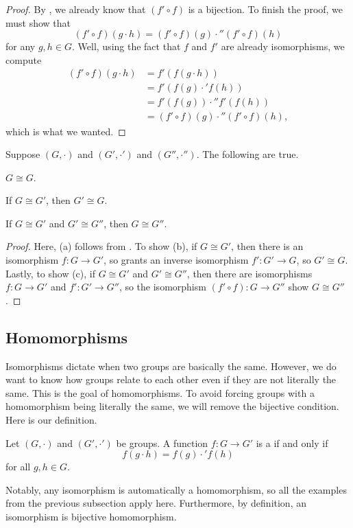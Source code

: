 \documentclass[../notes.tex]{subfiles}
\begin{document}
\begin{proof}
    By , we already know that $(f'\circ f)$ is a bijection. To finish the proof, we must show that
    \[(f'\circ f)(g\cdot h)=(f'\circ f)(g)\cdot''(f'\circ f)(h)\]
    for any $g,h\in G$. Well, using the fact that $f$ and $f'$ are already isomorphisms, we compute
    \begin{align*}
        (f'\circ f)(g\cdot h) &= f'(f(g\cdot h)) \\
        &= f'(f(g)\cdot'f(h)) \\
        &= f'(f(g))\cdot''f'(f(h)) \\
        &= (f'\circ f)(g)\cdot''(f'\circ f)(h),
    \end{align*}
    which is what we wanted.
\end{proof}
\begin{proposition}
    Suppose $(G,\cdot)$ and $(G',\cdot')$ and $(G'',\cdot'')$. The following are true.
    \begin{listalph}
        \item $G\cong G$.
        \item If $G\cong G'$, then $G'\cong G$.
        \item If $G\cong G'$ and $G'\cong G''$, then $G\cong G''$.
    \end{listalph}
\end{proposition}
\begin{proof}
    Here, (a) follows from . To show (b), if $G\cong G'$, then there is an isomorphism $f\colon G\to G'$, so  grants an inverse isomorphism $f'\colon G'\to G$, so $G'\cong G$. Lastly, to show (c), if $G\cong G'$ and $G'\cong G''$, then there are isomorphisms $f\colon G\to G'$ and $f'\colon G'\to G''$, so the isomorphism $(f'\circ f)\colon G\to G''$ show $G\cong G''$.
\end{proof}

\subsection{Homomorphisms}
Isomorphisms dictate when two groups are basically the same. However, we do want to know how groups relate to each other even if they are not literally the same. This is the goal of homomorphisms. To avoid forcing groups with a homomorphism being literally the same, we will remove the bijective condition. Here is our definition.
\begin{definition}[homomorphism]
    Let $(G,\cdot)$ and $(G',\cdot')$ be groups. A function $f\colon G\to G'$ is a  if and only if
    \[f(g\cdot h)=f(g)\cdot'f(h)\]
    for all $g,h\in G$.
\end{definition}
Notably, any isomorphism is automatically a homomorphism, so all the examples from the previous subsection apply here. Furthermore, by definition, an isomorphism is bijective homomorphism.
\end{document}

